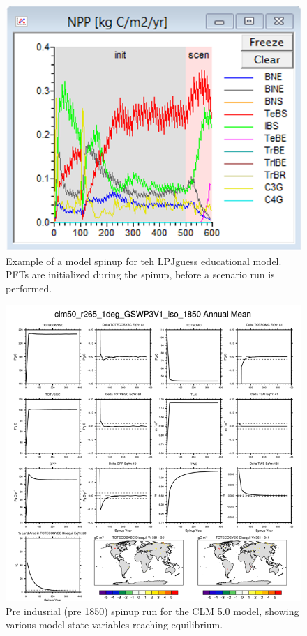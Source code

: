 \documentclass[12pt,oneside]{book}
\begin{document}
\begin{figure}

{\centering \includegraphics[width=0.8\linewidth]{figures/chap10/f10_3_LPJguess_spinup} 

}

\caption{Example of a model spinup for teh LPJguess educational model. PFTs are initialized during the spinup, before a scenario run is performed.}\label{fig:f103}
\end{figure}

\begin{figure}

{\centering \includegraphics[width=0.8\linewidth]{figures/chap10/f10_4_CLM_spinup} 

}

\caption{Pre indusrial (pre 1850) spinup run for the CLM 5.0 model, showing various model state variables reaching equilibrium.}\label{fig:f104}
\end{figure}
\end{document}
